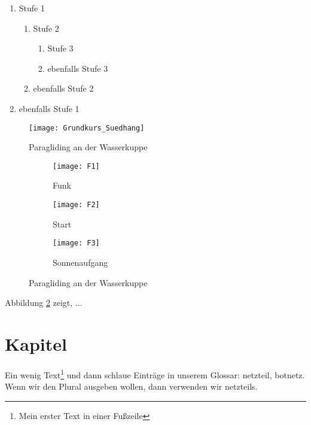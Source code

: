 \documentclass[twoside,12pt]{scrartcl}
\begin{document}
	\begin{enumerate}[label=\emph{\arabic*)}]
		\item Stufe 1
		\begin{enumerate}[label=\emph{\alph*)}]
			\item Stufe 2
			\begin{enumerate}[label=\emph{\roman*)}]
				\item Stufe 3
				\item ebenfalls Stufe 3
			\end{enumerate}
			\item ebenfalls Stufe 2
		\end{enumerate}
		\item ebenfalls Stufe 1
	\end{enumerate}
	\Blindtext
\begin{figure}
	\centering
	\texttt{[image: Grundkurs\_Suedhang]}
	\caption{Paragliding an der Wasserkuppe}
	\label{fig:Grundkurs_Suedhang}
\end{figure}


	
\begin{figure}
	\centering
	\begin{subfigure}[t]{.3\linewidth}
		\texttt{[image: F1]}
		\caption{Funk}
		\label{fig:sub1}
	\end{subfigure}%
	\hfill
	\begin{subfigure}[t]{.3\linewidth}
		\texttt{[image: F2]}
		\caption{Start}
		\label{fig:sub2}
	\end{subfigure}
	\hfill
	\begin{subfigure}[t]{.3\linewidth}
		\texttt{[image: F3]}
		\caption{Sonnenaufgang}
		\label{fig:sub3}
	\end{subfigure}%
	\caption{Paragliding an der Wasserkuppe}
	\label{fig:paragliding}
\end{figure}
	
	\vspace{1cm}
	
	Abbildung \ref{fig:sub1} zeigt, ...
	
	
	\vspace{1cm}
	
	\section{Kapitel}
\Blindtext

	
Ein wenig Text\footnote{Mein erster Text in einer Fußzeile} und dann schlaue Einträge in unserem Glossar: \gls{netzteil}, \gls{botnetz}. Wenn wir den Plural ausgeben wollen, dann verwenden wir \glspl{netzteil}.
\end{document}
